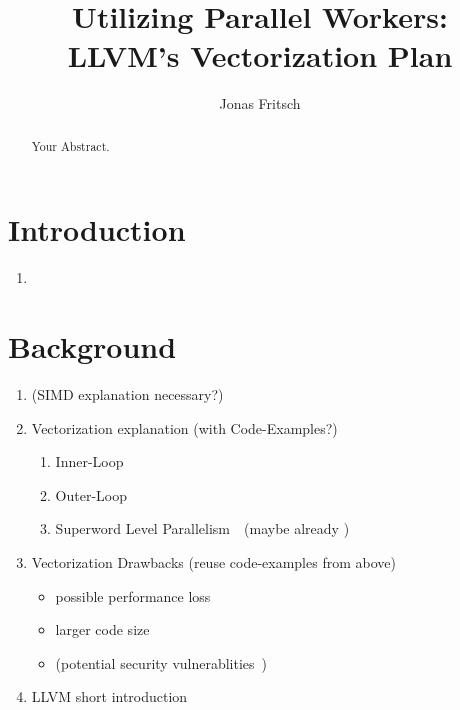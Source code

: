 \documentclass[sigplan,11pt,nonacm]{acmart}
\begin{document}
\title{Utilizing Parallel Workers: \\LLVM's Vectorization Plan}
\author{Jonas Fritsch}

\begin{abstract}
Your Abstract.
\end{abstract}

\maketitle



\section{Introduction}
\label{sec:introduction}

\begin{enumerate}
  \item 
\end{enumerate}




\section{Background}
\label{sec:background}
\begin{enumerate}
  \item (SIMD explanation necessary?)
  \item Vectorization explanation (with Code-Examples?)
  \begin{enumerate}
    \item Inner-Loop
    \item Outer-Loop
    \item Superword Level Parallelism~\cite{10.1145/349299.349320}~(maybe already \cite{10.1145/3519939.3523701})
  \end{enumerate}
  \item Vectorization Drawbacks (reuse code-examples from above)
  \begin{itemize}
    \item possible performance loss
    \item larger code size
    \item (potential security vulnerablities~\cite{2023arXiv230201131K})
  \end{itemize}
  \item LLVM short introduction
\end{enumerate}
\end{document}
